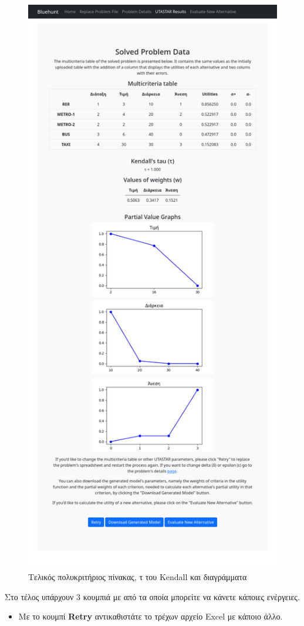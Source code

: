 \documentclass[11pt,a4paper,titlepage]{article}
\numberwithin{equation}{section}
\begin{document}
\begin{enumerate}
	\begin{figure}[H]
		\centering
		\includegraphics[width=0.65\linewidth]{media/results.png}
		\caption{Τελικός πολυκριτήριος πίνακας, τ του Kendall και διαγράμματα}
		\label{fig:results_1}
	\end{figure}
	

	Στο τέλος υπάρχουν 3 κουμπιά με από τα οποία μπορείτε να κάνετε κάποιες ενέργειες.
	
	\begin{itemize}
		\item Με το κουμπί \textbf{Retry} αντικαθιστάτε το τρέχων αρχείο Excel με κάποιο άλλο.
		

\end{itemize}
\end{enumerate}
\end{document}
